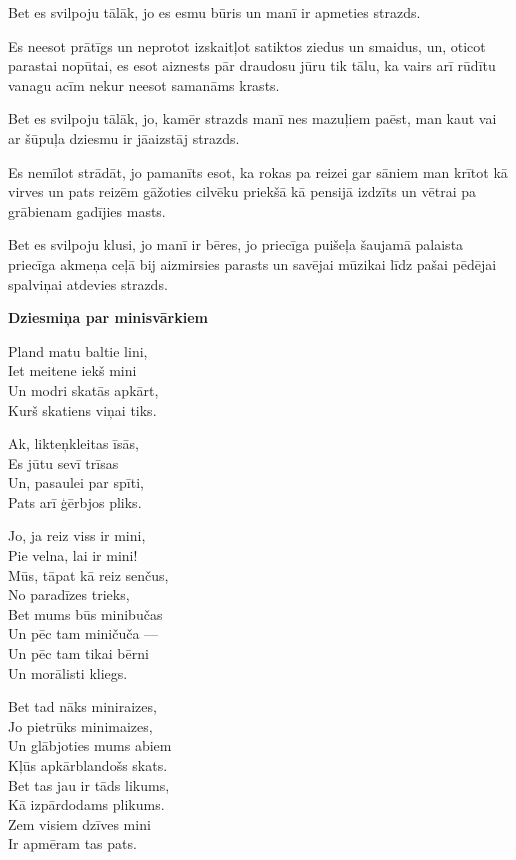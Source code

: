 \documentclass[14pt]{extarticle}
\begin{document}
Bet es svilpoju tālāk, jo es esmu būris un manī ir
apmeties strazds. 

Es neesot prātīgs un neprotot izskaitļot satiktos 
ziedus un smaidus, un, oticot parastai nopūtai, es
esot aiznests pār draudosu jūru tik tālu, ka vairs arī 
rūdītu vanagu acīm nekur neesot samanāms krasts. 

Bet es svilpoju tālāk, jo, kamēr strazds manī nes mazuļiem
paēst, man kaut vai ar šūpuļa dziesmu ir jāaizstāj
strazds. 

Es nemīlot strādāt, jo pamanīts esot, ka rokas pa reizei
gar sāniem man krītot kā virves un pats reizēm
gāžoties cilvēku priekšā kā pensijā izdzīts un vētrai pa grābienam gadījies masts. 

Bet es svilpoju klusi, jo manī ir bēres, jo priecīga puišeļa 
šaujamā palaista priecīga akmeņa ceļā bij aizmirsies 
parasts un savējai mūzikai līdz pašai pēdējai spalviņai
atdevies strazds. 



\newpage

{\bf Dziesmiņa par minisvārkiem}

Pland matu baltie lini,\\
Iet meitene iekš mini\\
Un modri skatās apkārt,\\
Kurš skatiens viņai tiks.

Ak, likteņkleitas īsās,\\
Es jūtu sevī trīsas\\
Un, pasaulei par spīti,\\
Pats arī ģērbjos pliks.

Jo, ja reiz viss ir mini,\\
Pie velna, lai ir mini!\\
Mūs, tāpat kā reiz senčus,\\
No paradīzes trieks,\\
Bet mums būs minibučas\\
Un pēc tam miničuča ---\\
Un pēc tam tikai bērni\\
Un morālisti kliegs.

Bet tad nāks miniraizes,\\
Jo pietrūks minimaizes,\\
Un glābjoties mums abiem\\
Kļūs apkārblandošs skats.\\
Bet tas jau ir tāds likums,\\
Kā izpārdodams plikums.\\
Zem visiem dzīves mini\\
Ir apmēram tas pats.
\end{document}
